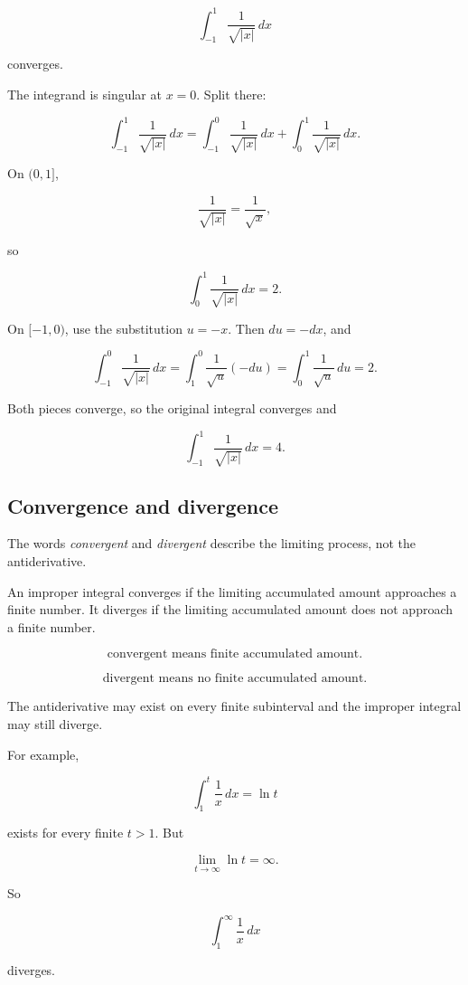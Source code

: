 \[
\int_{-1}^{1} \frac{1}{\sqrt{|x|}}\,dx
\]

converges.

The integrand is singular at \(x=0\).  Split there:

\[
\int_{-1}^{1} \frac{1}{\sqrt{|x|}}\,dx
=
\int_{-1}^{0} \frac{1}{\sqrt{|x|}}\,dx
+
\int_0^{1} \frac{1}{\sqrt{|x|}}\,dx.
\]

On \((0,1]\),

\[
\frac{1}{\sqrt{|x|}}=\frac1{\sqrt{x}},
\]

so

\[
\int_0^1 \frac{1}{\sqrt{|x|}}\,dx=2.
\]

On \([-1,0)\), use the substitution \(u=-x\).  Then \(du=-dx\), and

\[
\int_{-1}^{0} \frac{1}{\sqrt{|x|}}\,dx
=
\int_1^0 \frac{1}{\sqrt{u}}(-du)
=
\int_0^1 \frac{1}{\sqrt{u}}\,du
=
2.
\]

Both pieces converge, so the original integral converges and

\[
\boxed{
\int_{-1}^{1} \frac{1}{\sqrt{|x|}}\,dx=4.
}
\]

\subsection{Convergence and divergence}
\label{subsec:convergence-divergence-improper}

The words \emph{convergent} and \emph{divergent} describe the limiting process, not the
antiderivative.

An improper integral converges if the limiting accumulated amount approaches a finite
number.  It diverges if the limiting accumulated amount does not approach a finite
number.

\[
\boxed{
\text{convergent means finite accumulated amount.}
}
\]

\[
\boxed{
\text{divergent means no finite accumulated amount.}
}
\]

The antiderivative may exist on every finite subinterval and the improper integral may
still diverge.

For example,

\[
\int_1^t \frac1x\,dx=\ln t
\]

exists for every finite \(t>1\).  But

\[
\lim_{t\to\infty}\ln t=\infty.
\]

So

\[
\int_1^\infty \frac1x\,dx
\]

diverges.

